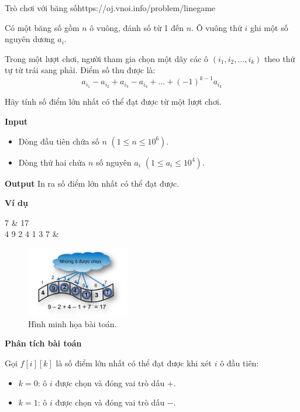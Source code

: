 \begin{baitap}{Trò chơi với băng số}{https://oj.vnoi.info/problem/linegame}

Có một băng số gồm $n$ ô vuông, đánh số từ 1 đến $n$.  
Ô vuông thứ $i$ ghi một số nguyên dương $a_i$.  

Trong một lượt chơi, người tham gia chọn một dãy các ô $(i_1, i_2, \dots, i_k)$ theo thứ tự từ trái sang phải.  
Điểm số thu được là:
\[
a_{i_1} - a_{i_2} + a_{i_3} - a_{i_4} + \dots + (-1)^{k-1} a_{i_k}
\]

Hãy tính số điểm lớn nhất có thể đạt được từ một lượt chơi.

\textbf{Input}
\begin{itemize}[noitemsep]
    \item Dòng đầu tiên chứa số $n$ $(1 \leq n \leq 10^6)$.
    \item Dòng thứ hai chứa $n$ số nguyên $a_i$ $(1 \leq a_i \leq 10^4)$.
\end{itemize}

\textbf{Output}  
In ra số điểm lớn nhất có thể đạt được.

\textbf{Ví dụ}

\begin{sampleio}
7 & 17 \\
4 9 2 4 1 3 7 & \\
\end{sampleio}

\begin{figure}[h]
    \centering
    \includegraphics[width=0.4\textwidth]{resource/img/linegame.png}
    \caption{Hình minh họa bài toán.}
\end{figure}

\end{baitap}
\textbf{Phân tích bài toán}  

Gọi $f[i][k]$ là số điểm lớn nhất có thể đạt được khi xét $i$ ô đầu tiên:  
\begin{itemize}
    \item $k = 0$: ô $i$ được chọn và đóng vai trò dấu $+$.
    \item $k = 1$: ô $i$ được chọn và đóng vai trò dấu $-$.
\end{itemize}

